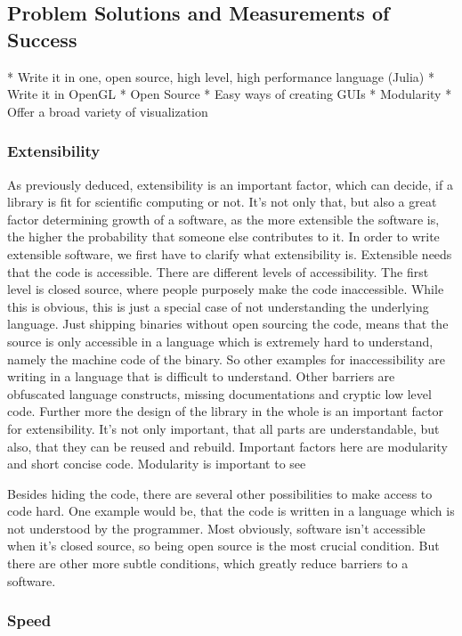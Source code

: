 \subsection{Problem Solutions and Measurements of Success}
* Write it in one, open source, high level, high performance language (Julia)
* Write it in OpenGL
* Open Source
* Easy ways of creating GUIs
* Modularity
* Offer a broad variety of visualization

\subsubsection{Extensibility}
As previously deduced, extensibility is an important factor, which can decide, if a library is fit for scientific computing or not. 
It's not only that, but also a great factor determining growth of a software, as the more extensible the software is, the higher the probability that someone else contributes to it.
In order to write extensible software, we first have to clarify what extensibility is.
Extensible needs that the code is accessible. There are different levels of accessibility. The first level is closed source, where people purposely make the code inaccessible. While this is obvious, this is just a special case of not understanding the underlying language. Just shipping binaries without open sourcing the code, means that the source is only accessible in a language which is extremely hard to understand, namely the machine code of the binary. So other examples for inaccessibility are writing in a language that is difficult to understand. Other barriers are obfuscated language constructs, missing documentations and cryptic low level code.
Further more the design of the library in the whole is an important factor for extensibility. It's not only important, that all parts are understandable, but also, that they can be reused and rebuild. Important factors here are modularity and short concise code.
Modularity is important to see 

Besides hiding the code, there are several other possibilities to make access to code hard. One example would be, that the code is written in a language which is not understood by the programmer. 
Most obviously, software isn't accessible when it's closed source, so being open source is the most crucial condition.
But there are other more subtle conditions, which greatly reduce barriers to a software.

\subsubsection{Speed}

